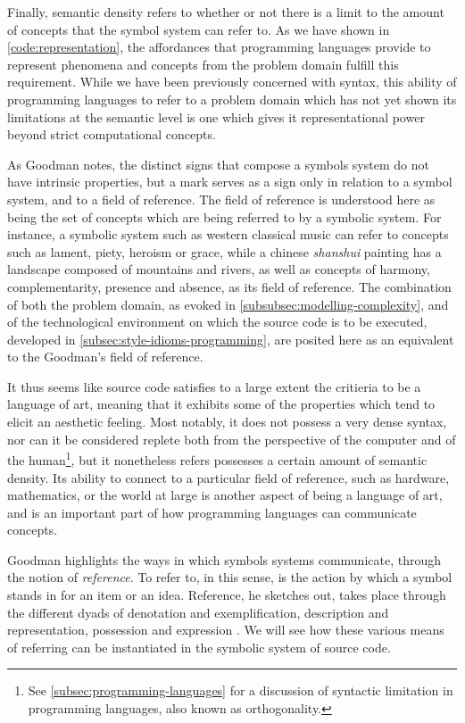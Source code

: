 Finally, semantic density refers to whether or not there is a limit to the amount of concepts that the symbol system can refer to. As we have shown in \autoref{code:representation}, the affordances that programming languages provide to represent phenomena and concepts from the problem domain fulfill this requirement. While we have been previously concerned with syntax, this ability of programming languages to refer to a problem domain which has not yet shown its limitations at the semantic level is one which gives it representational power beyond strict computational concepts.

As Goodman notes, the distinct signs that compose a symbols system do not have intrinsic properties, but a mark serves as a sign only in relation to a symbol system, and to a field of reference. The field of reference is understood here as being the set of concepts which are being referred to by a symbolic system. For instance, a symbolic system such as western classical music can refer to concepts such as lament, piety, heroism or grace, while a chinese \emph{shanshui} painting has a landscape composed of mountains and rivers, as well as concepts of harmony, complementarity, presence and absence, as its field of reference. The combination of both the problem domain, as evoked in \autoref{subsubsec:modelling-complexity}, and of the technological environment on which the source code is to be executed, developed in \autoref{subsec:style-idioms-programming}, are posited here as an equivalent to the Goodman's field of reference.

It thus seems like source code satisfies to a large extent the critieria to be a language of art, meaning that it exhibits some of the properties which tend to elicit an aesthetic feeling. Most notably, it does not possess a very dense syntax, nor can it be considered replete both from the perspective of the computer and of the human\footnote{See \autoref{subsec:programming-languages} for a discussion of syntactic limitation in programming languages, also known as orthogonality.}, but it nonetheless refers possesses a certain amount of semantic density. Its ability to connect to a particular field of reference, such as hardware, mathematics, or the world at large is another aspect of being a language of art, and is an important part of how programming languages can communicate concepts.

Goodman highlights the ways in which symbols systems communicate, through the notion of \emph{reference}. To refer to, in this sense, is the action by which a symbol stands in for an item or an idea. Reference, he sketches out, takes place through the different dyads of denotation and exemplification, description and representation, possession and expression \citep{goodman_languages_1976}. We will see how these various means of referring can be instantiated in the symbolic system of source code.

